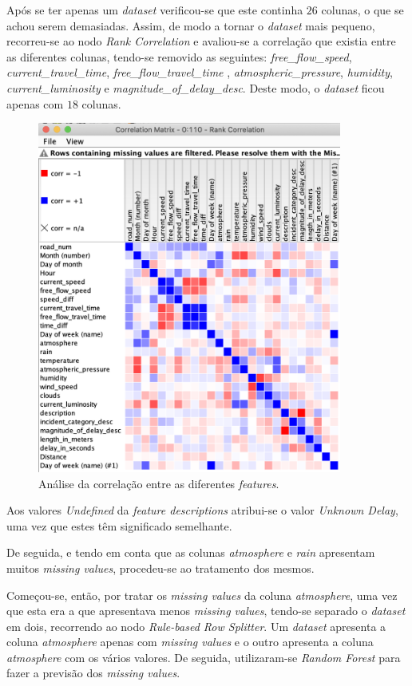 \documentclass[a4paper, 12pt]{article}
\begin{document}
Após se ter apenas um \textit{dataset} verificou-se que este continha $26$ colunas, o que se achou serem demasiadas. Assim, de modo a tornar o \textit{dataset} mais pequeno, recorreu-se ao nodo \textit{Rank Correlation} e avaliou-se a correlação que existia entre as diferentes colunas, tendo-se removido as seguintes: \textit{free\_flow\_speed}, \textit{current\_travel\_time}, \textit{free\_flow\_travel\_time }, \textit{atmospheric\_pressure}, \textit{humidity}, \textit{current\_luminosity} e \textit{magnitude\_of\_delay\_desc}. Deste modo, o \textit{dataset} ficou apenas com $18$ colunas.

\begin{figure}[H]
	\centering
	\includegraphics[width=10cm]{rank}
	\caption{Análise da correlação entre as diferentes \textit{features}.}
\end{figure}

Aos valores \textit{Undefined} da \textit{feature descriptions} atribui-se o valor \textit{Unknown Delay}, uma vez que estes têm significado semelhante.

De seguida, e tendo em conta que as colunas \textit{atmosphere} e \textit{rain} apresentam muitos \textit{missing values}, procedeu-se ao tratamento dos mesmos. 

Começou-se, então, por tratar os \textit{missing values} da coluna \textit{atmosphere}, uma vez que esta era a que apresentava menos \textit{missing values}, tendo-se separado o \textit{dataset} em dois, recorrendo ao nodo \textit{Rule-based Row Splitter}. Um \textit{dataset} apresenta a coluna \textit{atmosphere} apenas com \textit{missing values} e o outro apresenta a coluna \textit{atmosphere} com os vários valores. De seguida, utilizaram-se \textit{Random Forest} para fazer a previsão dos \textit{missing values}.
\end{document}
